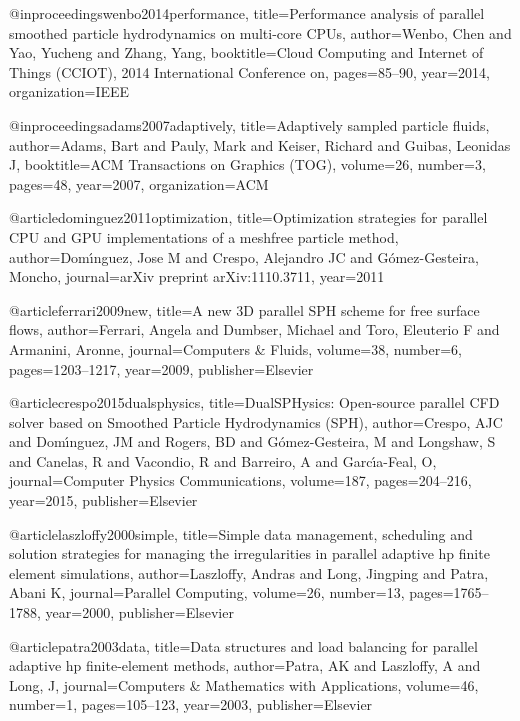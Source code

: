 @inproceedings{wenbo2014performance,
  title={Performance analysis of parallel smoothed particle hydrodynamics on multi-core CPUs},
  author={Wenbo, Chen and Yao, Yucheng and Zhang, Yang},
  booktitle={Cloud Computing and Internet of Things (CCIOT), 2014 International Conference on},
  pages={85--90},
  year={2014},
  organization={IEEE}
}

@inproceedings{adams2007adaptively,
  title={Adaptively sampled particle fluids},
  author={Adams, Bart and Pauly, Mark and Keiser, Richard and Guibas, Leonidas J},
  booktitle={ACM Transactions on Graphics (TOG)},
  volume={26},
  number={3},
  pages={48},
  year={2007},
  organization={ACM}
}

@article{dominguez2011optimization,
  title={Optimization strategies for parallel CPU and GPU implementations of a meshfree particle method},
  author={Dom{\'\i}nguez, Jose M and Crespo, Alejandro JC and G{\'o}mez-Gesteira, Moncho},
  journal={arXiv preprint arXiv:1110.3711},
  year={2011}
}

@article{ferrari2009new,
  title={A new 3D parallel SPH scheme for free surface flows},
  author={Ferrari, Angela and Dumbser, Michael and Toro, Eleuterio F and Armanini, Aronne},
  journal={Computers \& Fluids},
  volume={38},
  number={6},
  pages={1203--1217},
  year={2009},
  publisher={Elsevier}
}

@article{crespo2015dualsphysics,
  title={DualSPHysics: Open-source parallel CFD solver based on Smoothed Particle Hydrodynamics (SPH)},
  author={Crespo, AJC and Dom{\'\i}nguez, JM and Rogers, BD and G{\'o}mez-Gesteira, M and Longshaw, S and Canelas, R and Vacondio, R and Barreiro, A and Garc{\'\i}a-Feal, O},
  journal={Computer Physics Communications},
  volume={187},
  pages={204--216},
  year={2015},
  publisher={Elsevier}
}

@article{laszloffy2000simple,
  title={Simple data management, scheduling and solution strategies for managing the irregularities in parallel adaptive hp finite element simulations},
  author={Laszloffy, Andras and Long, Jingping and Patra, Abani K},
  journal={Parallel Computing},
  volume={26},
  number={13},
  pages={1765--1788},
  year={2000},
  publisher={Elsevier}
}

@article{patra2003data,
  title={Data structures and load balancing for parallel adaptive hp finite-element methods},
  author={Patra, AK and Laszloffy, A and Long, J},
  journal={Computers \& Mathematics with Applications},
  volume={46},
  number={1},
  pages={105--123},
  year={2003},
  publisher={Elsevier}
}

